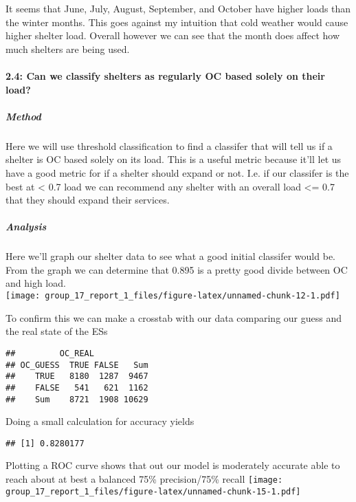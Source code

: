 \documentclass[
]{article}
\begin{document}
It seems that June, July, August, September, and October have higher
loads than the winter months. This goes against my intuition that cold
weather would cause higher shelter load. Overall however we can see that
the month does affect how much shelters are being used.

\hypertarget{can-we-classify-shelters-as-regularly-oc-based-solely-on-their-load}{%
\paragraph{2.4: Can we classify shelters as regularly OC based solely on
their
load?}\label{can-we-classify-shelters-as-regularly-oc-based-solely-on-their-load}}

\hypertarget{method-6}{%
\subparagraph{Method}\label{method-6}}

Here we will use threshold classification to find a classifer that will
tell us if a shelter is OC based solely on its load. This is a useful
metric because it'll let us have a good metric for if a shelter should
expand or not. I.e. if our classifer is the best at \textless{} 0.7 load
we can recommend any shelter with an overall load \textless= 0.7 that
they should expand their services.

\hypertarget{analysis-6}{%
\subparagraph{Analysis}\label{analysis-6}}

Here we'll graph our shelter data to see what a good initial classifer
would be. From the graph we can determine that 0.895 is a pretty good
divide between OC and high load.\\
\texttt{[image: group\_17\_report\_1\_files/figure-latex/unnamed-chunk-12-1.pdf]}

To confirm this we can make a crosstab with our data comparing our guess
and the real state of the ESs

\begin{verbatim}
##         OC_REAL
## OC_GUESS  TRUE FALSE   Sum
##    TRUE   8180  1287  9467
##    FALSE   541   621  1162
##    Sum    8721  1908 10629
\end{verbatim}

Doing a small calculation for accuracy yields

\begin{verbatim}
## [1] 0.8280177
\end{verbatim}

Plotting a ROC curve shows that out our model is moderately accurate
able to reach about at best a balanced 75\% precision/75\% recall
\texttt{[image: group\_17\_report\_1\_files/figure-latex/unnamed-chunk-15-1.pdf]}
\end{document}
